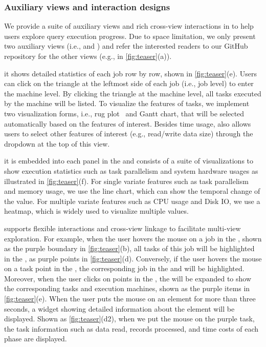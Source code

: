 \subsubsection{Auxiliary views and interaction designs}\label{sec:other}
We provide a suite of auxiliary views and rich cross-view interactions in \qevis{} to help users explore query execution progress. Due to space limitation, we only present two auxiliary views (i.e.,  and ) and refer the interested readers to our GitHub repository for the other views (e.g.,  in \autoref{fig:teaser}(a)).

 it shows detailed statistics of each job row by row, shown in \autoref{fig:teaser}(e). 
Users can click on the triangle at the leftmost side of each job (i.e., job level) to enter the machine level. 
By clicking the triangle at the machine level, all tasks executed by the machine will be listed. 
To visualize the features of tasks, we implement two visualization forms, i.e., rug plot~\cite{rug_plot} and Gantt chart, that will be selected automatically based on the features of interest.
Besides time usage,  also allows users to select other features of interest (e.g., read/write data size) through the dropdown at the top of this view.


 it is embedded into each panel in the  and consists of a suite of visualizations to show execution statistics such as task parallelism and system hardware usages as illustrated in \autoref{fig:teaser}(f).
For single variate features such as task parallelism and memory usage, we use the line chart, which can show the temporal change of the value. 
For multiple variate features such as CPU usage and Disk IO, we use a heatmap, which is widely used to visualize multiple values.


\qevis{} supports flexible interactions and cross-view linkage to facilitate multi-view exploration. 
For example, when the user hovers the mouse on a job in the , shown as the purple boundary in \autoref{fig:teaser}(b), all tasks of this job will be highlighted in the , as purple points in \autoref{fig:teaser}(d). 
Conversely, if the user hovers the mouse on a task point in the , the corresponding job in the  and  will be highlighted. 
Moreover, when the user clicks on points in the , the  will be expanded to show the corresponding tasks and execution machines, shown as the purple items in \autoref{fig:teaser}(e). 
When the user puts the mouse on an element for more than three seconds, a widget showing detailed information about the element will be displayed. 
Shown as \autoref{fig:teaser}(d2), when we put the mouse on the purple task, the task information such as data read, records processed, and time costs of each phase are displayed. 






